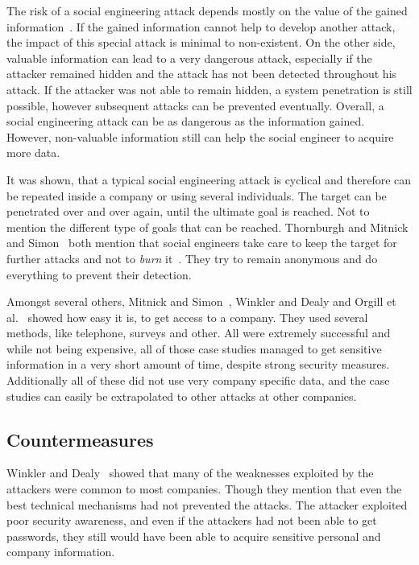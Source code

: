 The risk of a social engineering attack depends mostly on the value of the
gained information~\cite{thornburgh2004}. If the gained information cannot help
to develop another attack, the impact of this special attack is minimal to
non-existent. On the other side, valuable information can lead to a very
dangerous attack, especially if the attacker remained hidden and the attack has
not been detected throughout his attack. If the attacker was not able to remain
hidden, a system penetration is still possible, however subsequent attacks can
be prevented eventually. Overall, a social engineering attack can be as dangerous
as the information gained. However, non-valuable information still can help the
social engineer to acquire more data.

It was shown, that a typical social engineering attack is cyclical and
therefore can be repeated inside a company or using several individuals. The
target can be penetrated over and over again, until the ultimate goal is
reached. Not to mention the different type of goals that can be reached.
Thornburgh \cite{thornburgh2004} and Mitnick and Simon~\cite{mitnick2003} both
mention that social engineers take care to keep the target for further attacks
and not to \textit{burn} it~\cite{thornburgh2004}. They try to remain anonymous
and do everything to prevent their detection.

Amongst several others, Mitnick and Simon~\cite{mitnick2003}, Winkler and Dealy
\cite{winkler1995} and Orgill et al.~\cite{orgill2004} showed how easy it is,
to get access to a company. They used several methods, like telephone, surveys
and other. All were extremely successful and while not being expensive, all of
those case studies managed to get sensitive information in a very short amount
of time, despite strong security measures. Additionally all of these did not use very
company specific data, and the case studies can easily be extrapolated to other
attacks at other companies.

\subsection{Countermeasures}

Winkler and Dealy~\cite{winkler1995} showed that many of the weaknesses
exploited by the attackers were common to most companies. Though they mention
that even the best technical mechanisms had not prevented the attacks. The
attacker exploited poor security awareness, and even if the attackers had not
been able to get passwords, they still would have been able to acquire
sensitive personal and company information.


